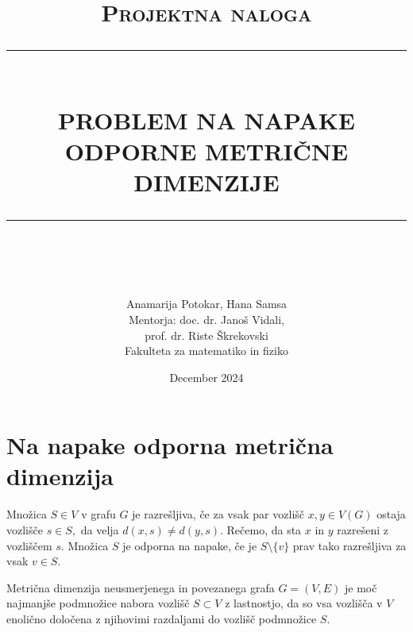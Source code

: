 \documentclass[12pt]{article}
\newcommand{\HRule}[1]{\rule{\linewidth}{#1}}
\begin{document}
\title{ \normalsize \textsc{Projektna naloga}
		\\ [2.0cm]
		\HRule{0.5pt} \\
		\LARGE \textbf{\uppercase{Problem na napake odporne metrične dimenzije}}
		\HRule{2pt} \\ [0.5cm]
		\normalsize \date{December 2024} \vspace*{5\baselineskip}}
\author{
		Anamarija Potokar, Hana Samsa 
        \vspace{1 cm} \\
		Mentorja: doc. dr. Janoš Vidali, \\
        prof. dr. Riste Škrekovski 
        \vspace{1 cm} \\
		Fakulteta za matematiko in fiziko }

\maketitle

\newpage

\section{Na napake odporna metrična dimenzija}

Množica $S \in V$ v grafu $G$ je razrešljiva, če za vsak par vozlišč $x, y \in V(G)$ 
ostaja vozlišče $s \in S,$ da velja $d(x, s) \neq d(y, s).$ Rečemo, da sta $x$ in $y$
razrešeni z vozliščem $s$. Množica $S$ je odporna na napake, če je 
$S \setminus \{v\}$ prav tako razrešljiva za vsak $v \in S.$ 

Metrična dimenzija neusmerjenega in povezanega grafa $G = (V, E)$ je moč najmanjše
podmnožice nabora vozlišč $S \subset V$ z lastnostjo, da so vsa vozlišča v $V$ 
enolično določena z njihovimi razdaljami do vozlišč podmnožice $S$.

\end{document}
